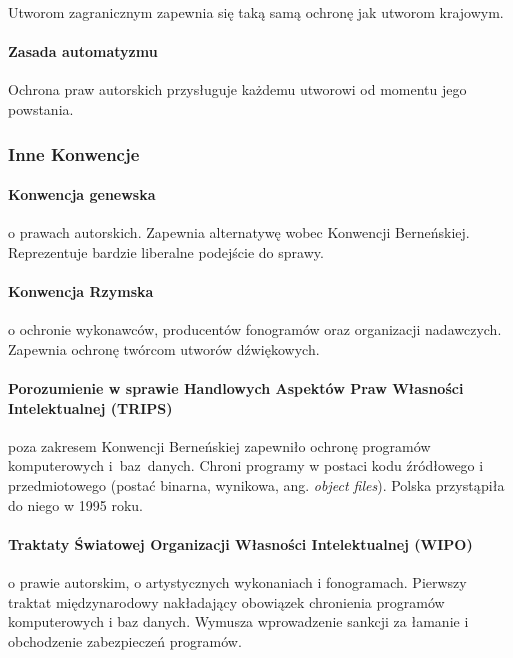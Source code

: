 \documentclass{article}
\begin{document}
Utworom zagranicznym zapewnia się taką samą ochronę jak utworom krajowym.

\paragraph{Zasada automatyzmu}

Ochrona praw autorskich przysługuje każdemu utworowi od momentu jego powstania.

\subsubsection{Inne Konwencje}

\paragraph{Konwencja genewska}

o prawach autorskich.
Zapewnia alternatywę wobec Konwencji Berneńskiej.
Reprezentuje bardzie liberalne podejście do sprawy.

\paragraph{Konwencja Rzymska}

o ochronie wykonawców, producentów fonogramów oraz organizacji nadawczych.
Zapewnia ochronę twórcom utworów dźwiękowych.

\paragraph{Porozumienie w sprawie Handlowych Aspektów Praw Własności Intelektualnej (TRIPS)}

poza zakresem Konwencji Berneńskiej zapewniło ochronę programów komputerowych i~baz~danych.
Chroni programy w postaci kodu źródłowego i przedmiotowego (postać binarna, wynikowa, ang. \textit{object files}). Polska przystąpiła do niego w 1995 roku.

\paragraph{Traktaty Światowej Organizacji Własności Intelektualnej (WIPO)}

o prawie autorskim, o artystycznych wykonaniach i fonogramach.
Pierwszy traktat międzynarodowy nakładający obowiązek chronienia programów komputerowych i baz danych.
Wymusza wprowadzenie sankcji za łamanie i obchodzenie zabezpieczeń programów.
\end{document}
